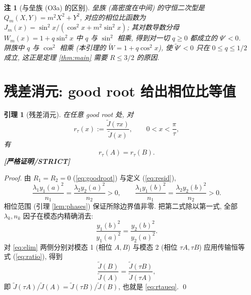 \documentclass[UTF8]{ctexart}
\newtheorem{lemma}[theorem]{引理}
\newtheorem{remark}[theorem]{注}
\newcommand{\STRICT}{\textbf{[严格证明/STRICT]}}
\begin{document}
\begin{remark}[与垒族 (O3a) 的区别]\label{rem:vsbarrier}
	垒族 (高密度在中间) 的守恒二次型是 $Q_m(X,Y)=m^2X^2+Y^2$, 对应的相位比函数为
	$J_m(x)=\sin^2x/(\cos^2x+m^2\sin^2x)$; 其对数导数分母 $W_m(x)=1+q\sin^2x$
	中 $q$ 与 $\sin^2$ 相乘, 得到对一切 $q\ge0$ 都成立的 $\Psi'<0$. 阱族中 $q$ 与
	$\cos^2$ 相乘 (本引理的 $\widetilde W=1+q\cos^2x$), 使 $\widetilde\Psi'<0$ 只在
	$0\le q\le 1/2$ 成立, 这正是定理 \ref{thm:main} 需要 $R\le 3/2$ 的原因.
\end{remark}

\section{残差消元: good root 给出相位比等值}\label{sec:elim}

\begin{lemma}[残差消元]\label{lem:elim}
	在任意 good root 处, 对
	\begin{equation}
		r_{\tau}(x):=\frac{\widetilde J(\tau x)}{\widetilde J(x)},\qquad
		0<x<\frac{\pi}{\tau},
	\end{equation}
	有
	\begin{equation}
		r_{\tau}(A)=r_{\tau}(B).
		\label{eq:rtaueq}
	\end{equation}
	\STRICT{}
\end{lemma}

\begin{proof}
	由 $R_1=R_2=0$ (\ref{eq:goodroot}) 与定义 (\ref{eq:resid}),
	\begin{equation}
		\frac{\lambda_1y_1(a)^2}{n_1}=\frac{\lambda_2y_2(a)^2}{n_2}>0,\qquad
		\frac{\lambda_1y_1(b)^2}{n_1}=\frac{\lambda_2y_2(b)^2}{n_2}>0.
	\end{equation}
	相位范围 (引理 \ref{lem:phases}) 保证所除边界值非零. 把第二式除以第一式,
	全部 $\lambda_k,n_k$ 因子在模态内精确消去:
	\begin{equation}
		\frac{y_1(b)^2}{y_1(a)^2}=\frac{y_2(b)^2}{y_2(a)^2}.
		\label{eq:elim}
	\end{equation}
	对 \eqref{eq:elim} 两侧分别对模态 1 (相位 $A,B$) 与模态 2 (相位 $\tau A,\tau B$)
	应用传输恒等式 (\ref{eq:ratio}), 得到
	\begin{equation}
		\frac{\widetilde J(B)}{\widetilde J(A)}
		=\frac{\widetilde J(\tau B)}{\widetilde J(\tau A)},
	\end{equation}
	即 $\widetilde J(\tau A)/\widetilde J(A)=\widetilde J(\tau B)/\widetilde J(B)$,
	也就是 \eqref{eq:rtaueq}. \qed
\end{proof}
\end{document}

